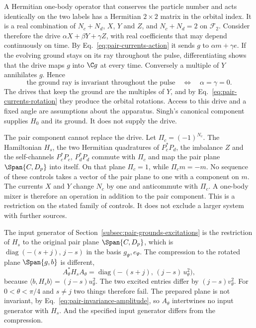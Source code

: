 A Hermitian one-body operator that conserves the particle number and acts identically on the two labels has a Hermitian $2\times2$ matrix in the orbital index. It is a real combination of $N_c+N_d$, $X$, $Y$ and $Z$, and $N_c+N_d=2$ on $\mathcal F_2$. Consider therefore the drive $\alpha X+\beta Y+\gamma Z$, with real coefficients that may depend continuously on time. By Eq.~\eqref{eq:pair-currents-action} it sends $g$ to $\alpha m+\gamma e$. If the evolving ground stays on its ray throughout the pulse, differentiating shows that the drive maps $g$ into $\C g$ at every time. Conversely a multiple of $Y$ annihilates $g$. Hence
\begin{equation}
 \text{the ground ray is invariant throughout the pulse}
 \quad\Longleftrightarrow\quad \alpha=\gamma=0 .
 \label{eq:pair-currents-drive}
\end{equation}
The drives that keep the ground are the multiples of $Y$, and by Eq.~\eqref{eq:pair-currents-rotation} they produce the orbital rotations. Access to this drive and a fixed angle are assumptions about the apparatus. Singh's canonical component supplies $H_0$ and its ground. It does not supply the drive.

The pair component cannot replace the drive. Let $\Pi_c=(-1)^{N_c}$. The Hamiltonian $H_s$, the two Hermitian quadratures of $P_c^*P_d$, the imbalance $Z$ and the self-channels $P_c^*P_c$, $P_d^*P_d$ commute with $\Pi_c$ and map the pair plane $\Span\{C,D_p\}$ into itself. On that plane $\Pi_c=1$, while $\Pi_cm=-m$. No sequence of these controls takes a vector of the pair plane to one with a component on $m$. The currents $X$ and $Y$ change $N_c$ by one and anticommute with $\Pi_c$. A one-body mixer is therefore an operation in addition to the pair component. This is a restriction on the stated family of controls. It does not exclude a larger system with further sources.

The input generator of Section~\ref{subsec:pair-grounds-excitations} is the restriction of $H_s$ to the original pair plane $\Span\{C,D_p\}$, which is $\operatorname{diag}(-(s+j),\,j-s)$ in the basis $g_\Psi,e_\Psi$. The compression to the rotated plane $\Span\{g,b\}$ is different,
\begin{equation}
 A_\theta^*H_sA_\theta=\operatorname{diag}\bigl(-(s+j),\,(j-s)\,u_\theta^2\bigr),
 \label{eq:pair-currents-compression}
\end{equation}
because $\langle b,H_sb\rangle=(j-s)u_\theta^2$. The two excited entries differ by $(j-s)v_\theta^2$. For $0<\theta<\pi/4$ and $s\ne j$ two things therefore fail. The prepared plane is not invariant, by Eq.~\eqref{eq:pair-invariance-amplitude}, so $A_\theta$ intertwines no input generator with $H_s$. And the specified input generator differs from the compression.

